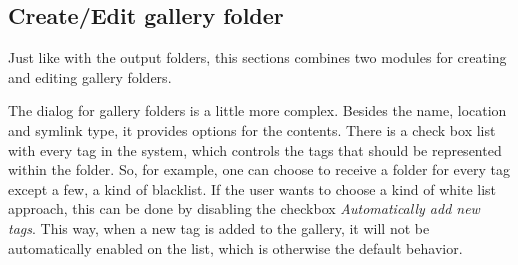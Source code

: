 \subsection{Create/Edit gallery folder}

Just like with the output folders, this sections combines two modules for creating and editing gallery folders.

The dialog for gallery folders is a little more complex. Besides the name, location and symlink type, it provides options for the contents. There is a check box list with every tag in the system, which controls the tags that should be represented within the folder. So, for example, one can choose to receive a folder for every tag except a few, a kind of blacklist. If the user wants to choose a kind of white list approach, this can be done by disabling the checkbox \emph{Automatically add new tags}. This way, when a new tag is added to the gallery, it will not be automatically enabled on the list, which is otherwise the default behavior.